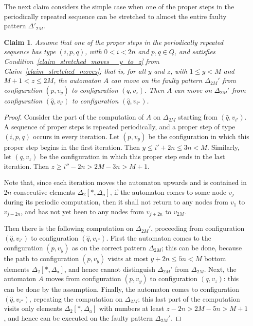 \documentclass[12pt,a4paper]{article}
\newtheorem{claim}{Claim}
\theoremstyle{definition}
\begin{document}
The next claim considers the simple case
when one of the proper steps in the periodically repeated sequence
can be stretched to almost the entire faulty pattern $\Delta'_{2M}$.

\begin{claim} \label{claim_eliminating_yz_case}
Assume that one of the proper steps in the periodically repeated sequence
has type $(i,p,q)$, with $0 < i < 2n$ and $p,q \in Q$,
and satisfies Condition~\ref{claim_stretched_moves__y_to_z}
from Claim~\ref{claim_stretched_moves};
that is, for all $y$ and $z$,
with $1 \leqslant y < M$ and $M+1 < z \leqslant 2M$,
the automaton $A$ can move on the faulty pattern $\Delta_{2M}'$
from configuration $(p, v_y)$ to configuration $(q,v_z)$.
Then $A$ can move on $\Delta_{2M}'$
from configuration $(\widehat{q},v_{i'})$
to configuration $(\widehat{q},v_{i''})$.
\end{claim}
\begin{proof}
Consider the part of the computation of $A$ on $\Delta_{2M}$
starting from $(\widehat{q},v_{i'})$.
A sequence of proper steps is repeated periodically,
and a proper step of type $(i,p,q)$ occurs in every iteration.
Let $(p,v_y)$ be the configuration in which this proper step begins in the first iteration.
Then $y \leqslant i'+2n \leqslant 3n < M$.
Similarly, let $(q,v_z)$ be the configuration in which this proper step ends in the last iteration.
Then $z \geqslant i''-2n > 2M-3n > M+1$.

Note that, since each iteration moves the automaton upwards
and is contained in $2n$ consecutive elements $\Delta_2[*,\Delta_a]$,
if the automaton comes to some node $v_j$ during its periodic computation,
then it shall not return to any nodes from $v_1$ to $v_{j-2n}$,
and has not yet been to any nodes from $v_{j+2n}$ to $v_{2M}$.

Then there is the following computation on $\Delta_{2M}'$,
proceeding from configuration $(\widehat{q},v_{i'})$
to configuration $(\widehat{q},v_{i''})$.
First the automaton comes to the configuration $(p,v_y)$ as on the correct pattern $\Delta_{2M}$;
this can be done, because the path to configuration $(p,v_y)$
visits at most $y+2n \leqslant 5n < M$ 
bottom elements $\Delta_2[*,\Delta_a]$,
and hence cannot distinguish $\Delta_{2M}'$ from $\Delta_{2M}$.
Next, the automaton $A$ moves from configuration $(p,v_y)$ to configuration $(q, v_z)$:
this can be done by the assumption.
Finally, the automaton comes to configuration $(\widehat{q},v_{i''})$,
repeating the computation on $\Delta_{2M}$;
this last part of the computation visits only elements $\Delta_2[*,\Delta_a]$
with numbers at least $z-2n > 2M-5n > M+1$,
and hence can be executed on the faulty pattern $\Delta_{2M}'$.
\end{proof}
\end{document}
